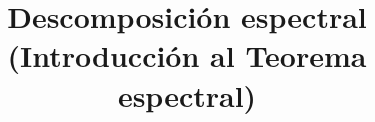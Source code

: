 \documentclass[12pt,dvipsnames]{article}
\begin{document}
\title{Descomposición espectral \\ (Introducción al Teorema espectral)}
\date{}
\maketitle




\end{document}
